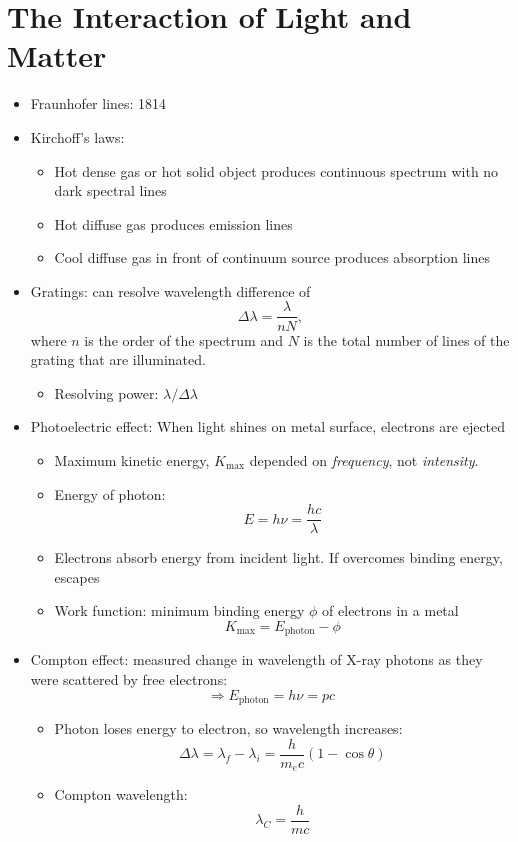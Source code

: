 \documentclass[12pt]{article}
\begin{document}
\section{The Interaction of Light and Matter}
\begin{itemize}
\item Fraunhofer lines: 1814
\item Kirchoff's laws:
\begin{itemize}
\item Hot dense gas or hot solid object produces continuous spectrum with no dark spectral lines
\item Hot diffuse gas produces emission lines
\item Cool diffuse gas in front of continuum source produces absorption lines
\end{itemize}
\item Gratings: can resolve wavelength difference of
\begin{equation}
\Delta \lambda = \frac{\lambda}{nN},
\end{equation}
where $n$ is the order of the spectrum and $N$ is the total number of lines of the grating that are illuminated.
\begin{itemize}
\item Resolving power: $\lambda/\Delta\lambda$
\end{itemize}
\item Photoelectric effect: When light shines on metal surface, electrons are ejected
\begin{itemize}
\item Maximum kinetic energy, $K_\text{max}$ depended on {\it frequency}, not {\it intensity}.
\item Energy of photon:
\begin{equation}
E = h\nu = \frac{hc}{\lambda}
\end{equation}
\item Electrons absorb energy from incident light. If overcomes binding energy, escapes
\item Work function: minimum binding energy $\phi$ of electrons in a metal
\begin{equation}
K_\text{max} = E_\text{photon} - \phi
\end{equation}
\end{itemize}
\item Compton effect: measured change in wavelength of X-ray photons as they were scattered by free electrons:
\begin{equation}
\Longrightarrow E_\text{photon} = h\nu = pc
\end{equation}
\begin{itemize}
\item Photon loses energy to electron, so wavelength increases:
\begin{equation}
\Delta \lambda = \lambda_f - \lambda_i = \frac{h}{m_e c}(1 - \cos\theta)
\end{equation}
\item Compton wavelength:
\begin{equation}
\lambda_C = \frac{h}{m c}
\end{equation}
\end{itemize}


\end{itemize}
\end{document}

